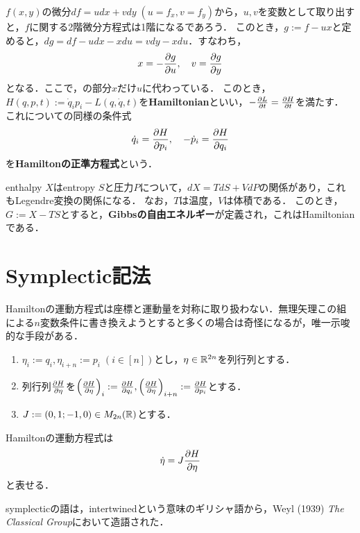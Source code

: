 \documentclass[uplatex, dvipdfmx]{jsreport}
\begin{document}
\begin{discussion}
    $f(x,y)$の微分$df=udx+vdy\;(u=f_x,v=f_y)$から，$u,v$を変数として取り出すと，$f$に関する2階微分方程式は1階になるであろう．
    このとき，$g:=f-ux$と定めると，$dg=df-udx-xdu=vdy-xdu$．すなわち，
    \[x=-\frac{\partial g}{\partial u},\quad v=\frac{\partial g}{\partial y}\]
    となる．ここで，の部分$x$だけ$u$に代わっている．
    このとき，$H(q,p,t):=\dot{q}_ip_i-L(q,\dot{q},t)$を\textbf{Hamiltonian}といい，$-\frac{\partial L}{\partial t}=\frac{\partial H}{\partial t}$を満たす．
    これについての同様の条件式
    \[\dot{q}_i=\frac{\partial H}{\partial p_i},\quad-\dot{p}_i=\frac{\partial H}{\partial q_i}\]
    を\textbf{Hamiltonの正準方程式}という．
\end{discussion}
\begin{example}
    enthalpy $X$はentropy $S$と圧力$P$について，$dX=TdS+VdP$の関係があり，これもLegendre変換の関係になる．
    なお，$T$は温度，$V$は体積である．
    このとき，$G:=X-TS$とすると，\textbf{Gibbsの自由エネルギー}が定義され，これはHamiltonianである．
\end{example}

\section{Symplectic記法}

\begin{tcolorbox}[colframe=ForestGreen, colback=ForestGreen!10!white,breakable,colbacktitle=ForestGreen!40!white,coltitle=black,fonttitle=\bfseries\sffamily,
title=]
    Hamiltonの運動方程式は座標と運動量を対称に取り扱わない．無理矢理この組による$n$変数条件に書き換えようとすると多くの場合は奇怪になるが，唯一示唆的な手段がある．
\end{tcolorbox}

\begin{definition}\mbox{}
    \begin{enumerate}
        \item $\eta_i:=q_i,\eta_{i+n}:=p_i\;(i\in[n])$とし，$\eta\in\mathbb{R}^{2n}$を列行列とする．
        \item 列行列$\frac{\partial H}{\partial \eta}$を$\left(\frac{\partial H}{\partial \eta}\right)_i:=\frac{\partial H}{\partial q_i},\left(\frac{\partial H}{\partial \eta}\right)_{i+n}:=\frac{\partial H}{\partial p_i}$とする．
        \item $J:=(0,1;-1,0)\in M_{2n}(\mathbb{R})$とする．
    \end{enumerate}
\end{definition}

\begin{theorem}
    Hamiltonの運動方程式は
    \[\dot{\eta}=J\frac{\partial H}{\partial \eta}\]
    と表せる．
\end{theorem}
\begin{history}
    symplecticの語は，intertwinedという意味のギリシャ語から，Weyl (1939) \textit{The Classical Group}において造語された．
\end{history}
\end{document}
